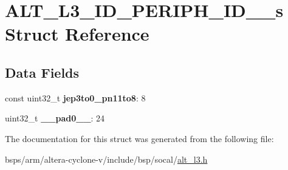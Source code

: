 \hypertarget{structALT__L3__ID__PERIPH__ID__1__s}{}\section{A\+L\+T\+\_\+\+L3\+\_\+\+I\+D\+\_\+\+P\+E\+R\+I\+P\+H\+\_\+\+I\+D\+\_\+\_\+s Struct Reference}
\label{structALT__L3__ID__PERIPH__ID__1__s}
\subsection*{Data Fields}
\begin{DoxyCompactItemize}
\item 
\mbox{\label{structALT__L3__ID__PERIPH__ID__1__s_aa4ef51b51223eaac56e19acec8e004c5}} 
const uint32\+\_\+t {\bfseries jep3to0\+\_\+pn11to8}\+: 8
\item 
\mbox{\label{structALT__L3__ID__PERIPH__ID__1__s_ab5d8e10a95e0ea21b69e8fa06815356d}} 
uint32\+\_\+t {\bfseries \+\_\+\+\_\+pad0\+\_\+\+\_\+}\+: 24
\end{DoxyCompactItemize}


The documentation for this struct was generated from the following file\+:\begin{DoxyCompactItemize}
\item 
bsps/arm/altera-\/cyclone-\/v/include/bsp/socal/\mbox{\hyperlink{alt__l3_8h}{alt\+\_\+l3.\+h}}\end{DoxyCompactItemize}
